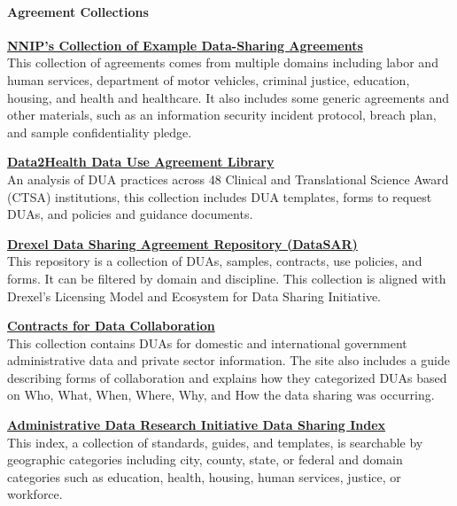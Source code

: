 \documentclass[
]{WileySix}
\begin{document}
\hypertarget{agreement-collections}{%
\paragraph{Agreement Collections}\label{agreement-collections}}

\textbf{\href{https://www.neighborhoodindicators.org/library/guides/nnip\%E2\%80\%99s-collection-example-data-sharing-agreements}{NNIP's Collection of Example Data-Sharing Agreements}}\\
This collection of agreements comes from multiple domains including labor and human services, department of motor vehicles, criminal justice, education, housing, and health and healthcare. It also includes some generic agreements and other materials, such as an information security incident protocol, breach plan, and sample confidentiality pledge.

\textbf{\href{https://github.com/data2health/governance-pathways/blob/master/library.md}{Data2Health Data Use Agreement Library}}\\
An analysis of DUA practices across 48 Clinical and Translational Science Award (CTSA) institutions, this collection includes DUA templates, forms to request DUAs, and policies and guidance documents.

\textbf{\href{http://datasar.cci.drexel.edu/index.html}{Drexel Data Sharing Agreement Repository (DataSAR)}}\\
This repository is a collection of DUAs, samples, contracts, use policies, and forms. It can be filtered by domain and discipline. This collection is aligned with Drexel's Licensing Model and Ecosystem for Data Sharing Initiative.

\textbf{\href{https://contractsfordatacollaboration.org/library/}{Contracts for Data Collaboration}}\\
This collection contains DUAs for domestic and international government administrative data and private sector information. The site also includes a guide describing forms of collaboration and explains how they categorized DUAs based on Who, What, When, Where, Why, and How the data sharing was occurring.

\textbf{\href{https://adri.georgetown.edu/}{Administrative Data Research Initiative Data Sharing Index}}\\
This index, a collection of standards, guides, and templates, is searchable by geographic categories including city, county, state, or federal and domain categories such as education, health, housing, human services, justice, or workforce.
\end{document}
